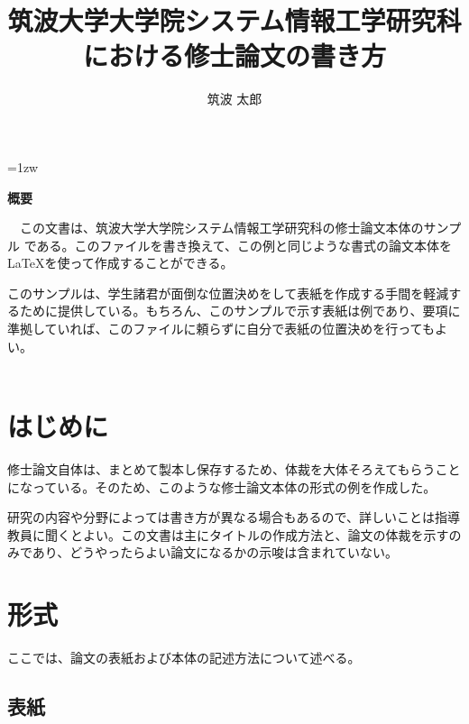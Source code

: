 \documentclass[a4paper,11pt,dvipdfmx]{ujreport}
\title{筑波大学大学院システム情報工学研究科\\における修士論文の書き方}
\author{筑波 太郎}
\begin{document}
\maketitle
\thispagestyle{empty}
\newpage

\thispagestyle{empty}
\vspace*{20pt plus 1fil}
\parindent=1zw
\noindent
\begin{center}
{\bf 概要}
\vspace{5mm}
\end{center}
　この文書は、筑波大学大学院システム情報工学研究科の修士論文本体のサンプル
である。このファイルを書き換えて、この例と同じような書式の論文本体を
\LaTeX を使って作成することができる。

このサンプルは、学生諸君が面倒な位置決めをして表紙を作成する手間を軽減す
るために提供している。もちろん、このサンプルで示す表紙は例であり、要項に
準拠していれば、このファイルに頼らずに自分で表紙の位置決めを行ってもよい。\\
\\
\par
\vspace{0pt plus 1fil}
\newpage

\tableofcontents
\listoffigures

\pagebreak \setcounter{page}{1}


\chapter{はじめに}

修士論文自体は、まとめて製本し保存するため、体裁を大体そろえてもらうことになっている。そのため、このような修士論文本体の形式の例を作成した。

研究の内容や分野によっては書き方が異なる場合もあるので、詳しいことは指導教員に聞くとよい。この文書は主にタイトルの作成方法と、論文の体裁を示すのみであり、どうやったらよい論文になるかの示唆は含まれていない。

\chapter{形式}

ここでは、論文の表紙および本体の記述方法について述べる。

\section{表紙}
\end{document}
